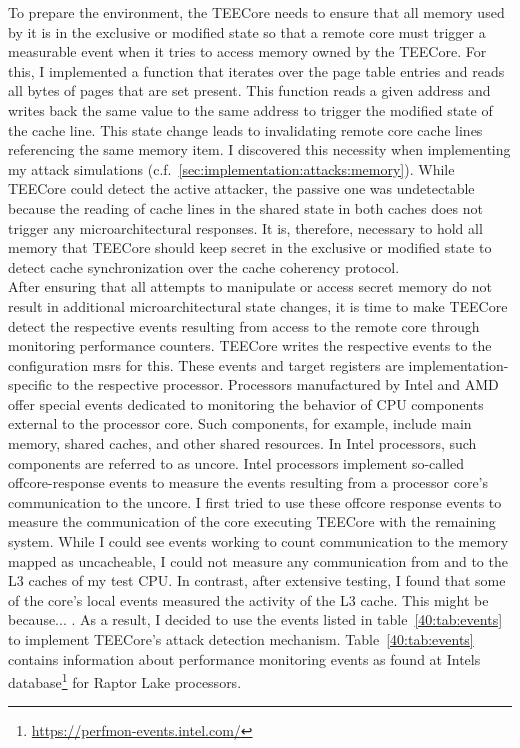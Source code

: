 To prepare the environment, the TEECore needs to ensure that all memory used by
it is in the exclusive or modified state so that a remote core must trigger a
measurable event when it tries to access memory owned by the TEECore. For this,
I implemented a function that iterates over the page table entries and reads all
bytes of pages that are set present. This function reads a given address and
writes back the same value to the same address to trigger the modified state of
the cache line. This state change leads to invalidating remote core cache lines
referencing the same memory item. I discovered this necessity when implementing
my attack simulations
(c.f.~\ref{sec:implementation:attacks:memory}). While
TEECore could detect the active attacker, the passive one was undetectable
because the reading of cache lines in the shared state in both caches does not
trigger any microarchitectural responses. It is, therefore, necessary to hold
all memory that TEECore should keep secret in the exclusive or modified state to
detect cache synchronization over the cache coherency protocol.\\

After ensuring that all attempts to manipulate or access secret memory do not
result in additional microarchitectural state changes, it is time to make
TEECore detect the respective events resulting from access to the remote core
through monitoring performance counters. TEECore writes the respective events to
the configuration \glspl{msr} for this. These events and target registers are
implementation-specific to the respective processor. Processors manufactured by
Intel and AMD offer special events dedicated to monitoring the behavior of CPU
components external to the processor core. Such components, for example, include
main memory, shared caches, and other shared resources. In Intel processors,
such components are referred to as uncore. Intel processors implement so-called
offcore-response events to measure the events resulting from a processor core's
communication to the uncore. I first tried to use these offcore response events
to measure the communication of the core executing TEECore with the remaining
system. While I could see events working to count communication to the memory
mapped as uncacheable, I could not measure any communication from and to the L3
caches of my test CPU. In contrast, after extensive testing, I found that some
of the core's local events measured the activity of the L3 cache. This might be
because... . As a result, I decided to use the
events listed in table~\ref{40:tab:events} to implement TEECore's attack
detection mechanism. Table~\ref{40:tab:events} contains information about
performance monitoring events as found at Intels
database\footnote{\url{https://perfmon-events.intel.com/}} for Raptor Lake
processors.

